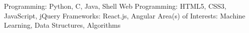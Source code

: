 \begin{cvhonors}
  \cvhonor
    {Programming:}
    {Python, C, Java, Shell}
    {}
    {}
  \cvhonor
    {Web Programming:}
    {HTML5, CSS3, JavaScript, jQuery}
    {}
    {}
  \cvhonor
    {Frameworks:}
    {React.js, Angular}
    {}
    {}
  \cvhonor
    {Area(s) of Interests:}
    {Machine Learning, Data Structures, Algorithms}
    {}
    {}
\end{cvhonors}



